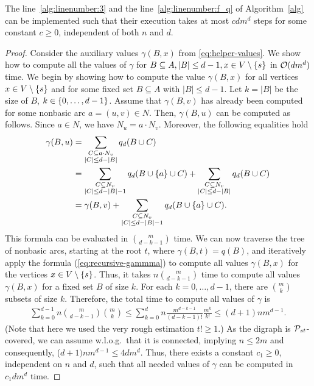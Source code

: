 \begin{lemma}
\label{lemma:faster-reduction}
The line~\ref{alg:linenumber:3} and the line~\ref{alg:linenumber:f_q} of Algorithm~\ref{alg} can be implemented such that their execution takes at most $c d m^d$ steps for some constant $c \geq 0$, independent of both $n$ and $d$.
\end{lemma}
\begin{proof}
    Consider the auxiliary  values $\gamma(B,x)$ from \cref{eq:helper-values}.
    We show how to compute all the values of $\gamma$ for $B \subseteq A, |B| \leq d-1, x \in V \setminus \{ s \}$ in $\mathcal{O}(dm^d)$ time. We begin by showing how to compute the value $\gamma(B, x)$ for all vertices $x \in V\setminus\{ s \}$ and  for some fixed set $B \subseteq A$ with $|B| \leq d-1$. Let $k = |B|$ be the size of $B$,  $k \in \{ 0, \ldots, d-1 \}$. Assume that $\gamma(B, v)$ has  already been computed for some nonbasic arc $a = (u, v) \in N$. Then,  $\gamma(B,u)$ can be computed as follows.  Since  $a \in N$, we have $N_u = a \cdot N_v$. Moreover, the following equalities hold 
    \begin{align}
        \gamma(B, u) &= \sum_{\substack{C \subseteq a \cdot N_v\\ |C| \leq d - |B|}}q_d(B \cup C) \nonumber\\
        &=  \sum_{\substack{C \subseteq N_v\\ |C| \leq d - |B| - 1}}q_d(B \cup \{ a \} \cup C) + \sum_{\substack{C \subseteq N_v\\ |C| \leq d - |B|}}q_d(B \cup C)\nonumber\\
        &=  \gamma(B, v) + \sum_{\substack{C \subseteq N_v\\ |C| \leq d - |B| - 1}}q_d(B \cup \{ a \} \cup C). \label{eq:recursive-gammma}
    \end{align}
    This formula can be evaluated in $\binom{m}{{d - k - 1}}$ time. We can now traverse the tree of nonbasic arcs, starting at the root $t$, where $\gamma(B, t) = q(B)$, and iteratively apply the formula (\ref{eq:recursive-gammma}) to compute  all  values $\gamma(B, x)$ for the vertices $x \in V \setminus \{ s \}$.
    Thus,  it takes $n\binom{m}{{d - k - 1}}$ time to compute all values $\gamma(B, x)$ for a fixed set $B$ of size $k$. For each $k = 0,\dots,d-1$, there are $\binom{m}{k}$ subsets of size $k$. Therefore, the total time to compute all values of $\gamma$ is
    \begin{align*}
        \sum_{k=0}^{d-1} n\binom{m}{d - k - 1}\binom{m}{k} \leq \sum_{k=0}^d n\frac{m^{d-k-1}}{(d-k-1)!} \frac{m^k}{k!} \leq (d+1) nm^{d-1}.
    \end{align*}
    (Note that here we used the very rough estimation $t! \geq 1$.) As the digraph is $\mathcal{P}_{st}$-covered, we can assume w.l.o.g.\ that it is connected, implying  $n\le 2m$ and  consequently,    ($d+1) nm^{d-1}\le 4dm^d$. Thus,  there exists a  constant $c_1 \geq 0$, independent on $n$ and $d$,  such that all needed values of $\gamma$ can be computed in $c_1dm^d$ time. 


\end{proof}
